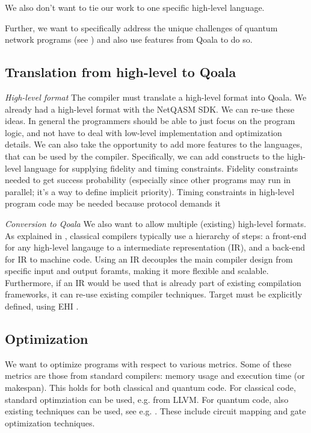 We also don't want to tie our work to one specific high-level language.

Further, we want to specifically address the unique challenges of quantum network programs (see ) and also use features from Qoala to do so.


\subsection{Translation from high-level to Qoala}
\textit{High-level format}
The compiler must translate a high-level format into Qoala.
We already had a high-level format with the NetQASM SDK.
We can re-use these ideas.
In general the programmers should be able to just focus on the program logic, and not have to deal with low-level implementation and optimization details.
We can also take the opportunity to add more features to the languages, that can be used by the compiler.
Specifically, we can add constructs to the high-level language for supplying fidelity and timing constraints.
Fidelity constraints needed to get success probability (especially since other programs may run in parallel; it's a way to define implicit priority).
Timing constraints in high-level program code may be needed because protocol demands it

\textit{Conversion to Qoala}
We also want to allow multiple (existing) high-level formats.
As explained in , classical compilers typically use a hierarchy of steps: a front-end for any high-level langauge to a intermediate representation (IR), and a back-end for IR to machine code.
Using an IR decouples the main compiler design from specific input and output foramts, making it more flexible and scalable.
Furthermore, if an IR would be used that is already part of existing compilation frameworks, it can re-use existing compiler techniques.
Target must be explicitly defined, using EHI .


\subsection{Optimization}
We want to optimize programs with respect to various metrics.
Some of these metrics are those from standard compilers: memory usage and execution time (or makespan).
This holds for both classical and quantum code.
For classical code, standard optimziation can be used, e.g. from LLVM.
For quantum code, also existing techniques can be used, see e.g. .
These include circuit mapping and gate optimization techniques.

